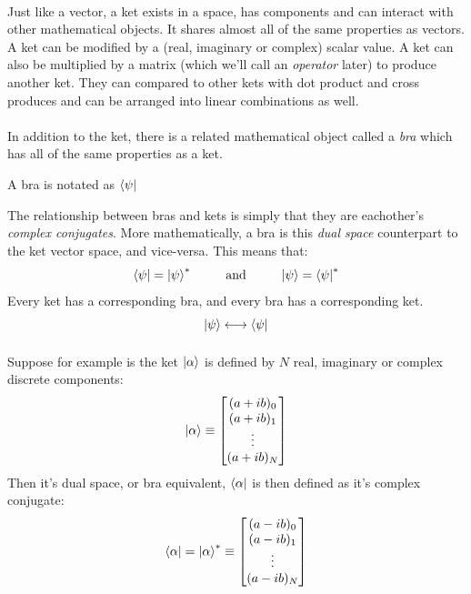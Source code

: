 \documentclass[12pt,letterpaper]{book}
\begin{document}
\paragraph*{}Just like a vector, a ket exists in a space, has components and can interact with other mathematical objects. It shares almost all of the same properties as vectors. A ket can be modified by a (real, imaginary or complex) scalar value. A ket can also be multiplied by a matrix (which we'll call an \textit{operator} later) to produce another ket. They can compared to other kets with dot product and cross produces and can be arranged into linear combinations as well.
\paragraph*{}In addition to the ket, there is a related mathematical object called a \textit{bra} which has all of the same properties as a ket.
\begin{center}
A bra is notated as $\bra{\psi}$
\end{center}
The relationship between bras and kets is simply that they are eachother's \textit{complex conjugates}. More mathematically, a bra is this \textit{dual space} counterpart to the ket vector space, and vice-versa. This means that:
\begin{equation}
\label{bra-ket relation}
\bra{\psi} = \ket{\psi}^* 
\text{\hspace*{8mm} and \hspace*{8mm}} 
\ket{\psi} = \bra{\psi}^*
\end{equation}
Every ket has a corresponding bra, and every bra has a corresponding ket.
\begin{equation}
\ket{\psi} \longleftrightarrow \bra{\psi}
\end{equation}

\paragraph*{}Suppose for example is the ket $\ket{\alpha}$ is defined by $N$ real, imaginary or complex discrete components:
\begin{equation}
\label{discrete ket}
\ket{\alpha} \equiv
\begin{bmatrix}
(a + ib)_0 \\ (a + ib)_1 \\ \vdots \\ (a + ib)_N
\end{bmatrix}
\end{equation}
Then it's dual space, or bra equivalent, $\bra{\alpha}$ is then defined as it's  complex conjugate:
\begin{equation}
\label{discrete bra}
\bra{\alpha} = 
\ket{\alpha}^* \equiv
\begin{bmatrix}
(a - ib)_0 \\ (a - ib)_1 \\ \vdots \\ (a - ib)_N
\end{bmatrix}
\end{equation}
\end{document}
